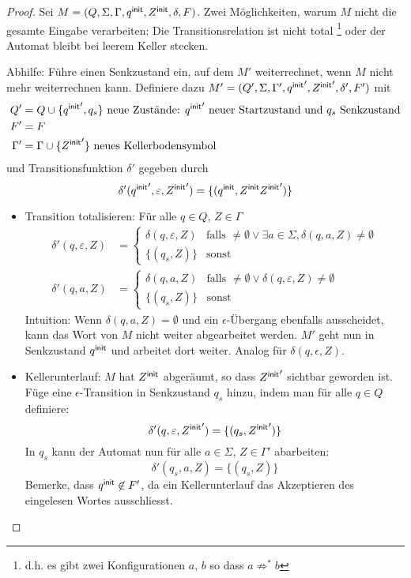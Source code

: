 {\begin{proof}
  Sei $M = (Q, \Sigma, \Gamma, q^\mathsf{init}, Z^\mathsf{init}, \delta, F)$. 
  Zwei Möglichkeiten, warum $M$ nicht die gesamte Eingabe verarbeiten:
  Die Transitionsrelation ist nicht total \footnote{d.h. es gibt zwei Konfigurationen $a$, $b$
  so dass $a \not \Rightarrow^* b$} oder der Automat bleibt bei
  leerem Keller stecken.

  Abhilfe: Führe einen Senkzustand ein, auf dem $M'$ weiterrechnet, wenn $M$ nicht mehr weiterrechnen kann. Definiere dazu $M' = (Q', \Sigma, \Gamma', {q^\mathsf{init}}', {Z^\mathsf{init}}', \delta', F')$ mit
  \begin{align*}
  Q' &= Q \cup \{{q^\mathsf{init}}', q_s\} \text{ neue Zustände: ${q^\mathsf{init}}'$ neuer Startzustand und $q_s$ Senkzustand} \\
  F' &= F \\
  \Gamma' &= \Gamma \cup \{{Z^\mathsf{init}}'\} \text{ neues Kellerbodensymbol}
  \end{align*}
  und Transitionsfunktion $\delta'$ gegeben durch
  \[\delta' ({q^\mathsf{init}}', \varepsilon, {Z^\mathsf{init}}') = \{ (q^\mathsf{init}, Z^\mathsf{init}{Z^\mathsf{init}}') \} \]
  \begin{itemize}
  \item Transition totalisieren: Für alle $q\in Q$, $Z \in \Gamma$\\
    \begin{align*}
      \delta' (q, \varepsilon, Z) &=
      \begin{cases}
        \delta (q, \varepsilon, Z) & \text{falls
        }\ne\emptyset\vee\exists a\in\Sigma, \delta (q, a, Z)\ne \emptyset \\
        \{ (q_s, Z) \} & \text{sonst}
      \end{cases} \\
      \delta' (q, a, Z) &=
      \begin{cases}
        \delta (q, a, Z) & \text{falls }\ne\emptyset\vee\delta (q,
        \varepsilon, Z) \ne \emptyset \\
        \{ (q_s, Z) \} & \text{sonst}
      \end{cases}
    \end{align*}
    Intuition: Wenn $\delta(q, a, Z) = \emptyset$ und ein $\epsilon$-Übergang ebenfalls ausscheidet, kann das Wort von $M$ nicht weiter abgearbeitet werden. $M'$ geht nun in Senkzustand $q^\mathsf{init}$ und arbeitet dort weiter. Analog für $\delta(q, \epsilon, Z)$.
  \item Kellerunterlauf: $M$ hat $Z^\mathsf{init}$ abgeräumt, so dass ${Z^\mathsf{init}}'$
    sichtbar geworden ist. Füge eine $\epsilon$-Transition in
     Senkzustand $q_s$ hinzu, indem man für alle $q\in Q$ definiere:\\
    \[\delta' (q, \varepsilon, {Z^\mathsf{init}}') = \{ (q_s, {Z^\mathsf{init}}') \} \]
  In $q_s$ kann der Automat nun für alle $a\in\Sigma$, $Z\in \Gamma'$ abarbeiten:\\
    \[\delta' (q_s, a, Z) = \{ (q_s, Z) \}\]   %
    Bemerke, dass $q^\mathsf{init} \not \in F'$, da ein Kellerunterlauf
    das Akzeptieren des eingelesen Wortes ausschliesst.
  \end{itemize}


\end{proof}}
